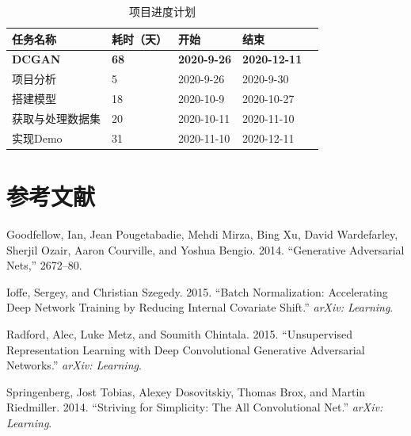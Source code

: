 \documentclass[hyperref, a4paper]{ctexart}
\begin{document}
\begin{table}
    \caption{项目进度计划}
    \centering
    \begin{tabular}{|p{2.0cm}<{\centering}|p{1.0cm}<{\centering}|p{2.0cm}<{\centering}|p{2.0cm}<{\centering}|p{2.0cm}<{\centering}|}
    \hline
    任务名称     & 耗时（天） & 开始         & 结束         \\ \hline
    \textbf{DCGAN}    & \textbf{68}    & \textbf{2020-9-26}  & \textbf{2020-12-11} \\ \hline
    项目分析     & 5     & 2020-9-26  & 2020-9-30  \\ \hline
    搭建模型     & 18     & 2020-10-9  & 2020-10-27 \\ \hline
    获取与处理数据集 & 20     & 2020-10-11 & 2020-11-10 \\ \hline
    实现Demo   & 31    & 2020-11-10 & 2020-12-11 \\ \hline
    \end{tabular}
\end{table}

\pagebreak

\hypertarget{ux53c2ux8003ux6587ux732e}{%
\section*{参考文献}\label{ux53c2ux8003ux6587ux732e}}

\hypertarget{refs}{}
\leavevmode\hypertarget{ref-goodfellow2014generative}{}%
Goodfellow, Ian, Jean Pougetabadie, Mehdi Mirza, Bing Xu, David
Wardefarley, Sherjil Ozair, Aaron Courville, and Yoshua Bengio. 2014.
``Generative Adversarial Nets,'' 2672--80.

\leavevmode\hypertarget{ref-ioffe2015batch}{}%
Ioffe, Sergey, and Christian Szegedy. 2015. ``Batch Normalization:
Accelerating Deep Network Training by Reducing Internal Covariate
Shift.'' \emph{arXiv: Learning}.

\leavevmode\hypertarget{ref-radford2015unsupervised}{}%
Radford, Alec, Luke Metz, and Soumith Chintala. 2015. ``Unsupervised
Representation Learning with Deep Convolutional Generative Adversarial
Networks.'' \emph{arXiv: Learning}.

\leavevmode\hypertarget{ref-springenberg2014striving}{}%
Springenberg, Jost Tobias, Alexey Dosovitskiy, Thomas Brox, and Martin
Riedmiller. 2014. ``Striving for Simplicity: The All Convolutional
Net.'' \emph{arXiv: Learning}.
\end{document}
